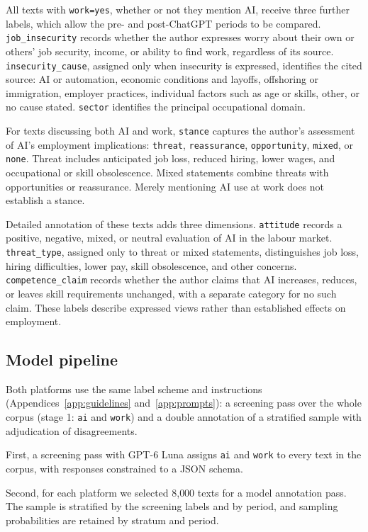 \documentclass[11pt]{article}
\begin{document}
All texts with \texttt{work=yes}, whether or not they mention AI,
receive three further labels, which allow the pre- and
post-ChatGPT periods to be compared.
\texttt{job\_insecurity} records whether the author expresses
worry about their own or others' job security, income, or
ability to find work, regardless of its source.
\texttt{insecurity\_cause}, assigned only when insecurity is
expressed, identifies the cited source: AI or automation,
economic conditions and layoffs, offshoring or immigration,
employer practices, individual factors such as age or skills,
other, or no cause stated.
\texttt{sector} identifies the principal occupational domain.

For texts discussing both AI and work, \texttt{stance} captures
the author's assessment of AI's employment implications:
\texttt{threat}, \texttt{reassurance}, \texttt{opportunity},
\texttt{mixed}, or \texttt{none}. Threat includes anticipated
job loss, reduced hiring, lower wages, and occupational or
skill obsolescence. Mixed statements combine threats with
opportunities or reassurance. Merely mentioning AI use at work
does not establish a stance.

Detailed annotation of these texts adds three dimensions.
\texttt{attitude} records a positive, negative, mixed, or neutral
evaluation of AI in the labour market.
\texttt{threat\_type}, assigned only to threat or mixed
statements, distinguishes job loss, hiring difficulties,
lower pay, skill obsolescence, and other concerns.
\texttt{competence\_claim} records whether the author claims
that AI increases, reduces, or leaves skill requirements
unchanged, with a separate category for no such claim.
These labels describe expressed views rather than
established effects on employment.

\subsection{Model pipeline}

Both platforms use the same label scheme and instructions
(Appendices~\ref{app:guidelines} and~\ref{app:prompts}): a screening pass over the whole corpus (stage 1: \texttt{ai} and
\texttt{work}) and a double annotation of a stratified sample with
adjudication of disagreements.

First, a screening pass with
GPT-6 Luna assigns \texttt{ai} and \texttt{work} to every text in the
corpus, with responses constrained to a JSON schema.

Second, for each platform we selected 8,000 texts for a model annotation
pass. The sample is stratified by the screening labels and by period, and
sampling probabilities are retained by stratum and period.
\end{document}
